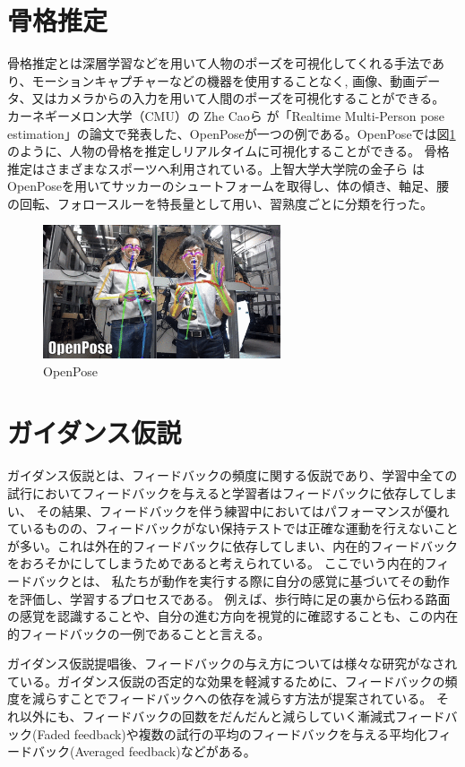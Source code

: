 \section{骨格推定}
骨格推定とは深層学習などを用いて人物のポーズを可視化してくれる手法であり、モーションキャプチャーなどの機器を使用することなく,
画像、動画データ、又はカメラからの入力を用いて人間のポーズを可視化することができる。
カーネギーメロン大学（CMU）の Zhe Caoら が「Realtime Multi-Person pose estimation」\cite{openpose}の論文で発表した、OpenPoseが一つの例である。OpenPoseでは図\ref{fig:openpose}のように、人物の骨格を推定しリアルタイムに可視化することができる。
骨格推定はさまざまなスポーツへ利用されている。上智大学大学院の金子ら \cite{soccer_openpose}はOpenPoseを用いてサッカーのシュートフォームを取得し、体の傾き、軸足、腰の回転、フォロースルーを特長量として用い、習熟度ごとに分類を行った。
\begin{figure}[htbp]
    \begin{center}
        \includegraphics[width=7cm]{figures/openpose.png}
        \caption{OpenPose}
        \label{fig:openpose}
    \end{center}
  \end{figure}
\section{ガイダンス仮説}
ガイダンス仮説\cite{guidance_hypothesis}とは、フィードバックの頻度に関する仮説であり、学習中全ての試行においてフィードバックを与えると学習者はフィードバックに依存してしまい、
その結果、フィードバックを伴う練習中においてはパフォーマンスが優れているものの、フィードバックがない保持テストでは正確な運動を行えないことが多い。これは外在的フィードバックに依存してしまい、内在的フィードバックをおろそかにしてしまうためであると考えられている。
ここでいう内在的フィードバックとは、
私たちが動作を実行する際に自分の感覚に基づいてその動作を評価し、学習するプロセスである。
例えば、歩行時に足の裏から伝わる路面の感覚を認識することや、自分の進む方向を視覚的に確認することも、この内在的フィードバックの一例であることと言える。\cite{nagoyahml_feedback}

ガイダンス仮説提唱後、フィードバックの与え方については様々な研究がなされている。ガイダンス仮説の否定的な効果を軽減するために、フィードバックの頻度を減らすことでフィードバックへの依存を減らす方法が提案されている。
それ以外にも、フィードバックの回数をだんだんと減らしていく漸減式フィードバック(Faded feedback)\cite{Aoyagi2019}や複数の試行の平均のフィードバックを与える平均化フィードバック(Averaged feedback)\cite{Aoyagi2019}などがある。
